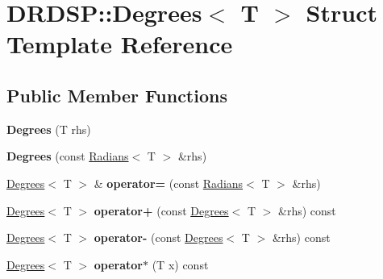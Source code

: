 \hypertarget{struct_d_r_d_s_p_1_1_degrees}{\section{D\-R\-D\-S\-P\-:\-:Degrees$<$ T $>$ Struct Template Reference}
\label{struct_d_r_d_s_p_1_1_degrees}
}
\subsection*{Public Member Functions}
\begin{DoxyCompactItemize}
\item 
\hypertarget{struct_d_r_d_s_p_1_1_degrees_aea5edb6561a07718684dabe4db75023a}{{\bfseries Degrees} (T rhs)}\label{struct_d_r_d_s_p_1_1_degrees_aea5edb6561a07718684dabe4db75023a}

\item 
\hypertarget{struct_d_r_d_s_p_1_1_degrees_a0d9d008f3a956963c5948ef48804f4bd}{{\bfseries Degrees} (const \hyperlink{struct_d_r_d_s_p_1_1_radians}{Radians}$<$ T $>$ \&rhs)}\label{struct_d_r_d_s_p_1_1_degrees_a0d9d008f3a956963c5948ef48804f4bd}

\item 
\hypertarget{struct_d_r_d_s_p_1_1_degrees_ac3bcd16cbcc7506b8a106137886517bc}{\hyperlink{struct_d_r_d_s_p_1_1_degrees}{Degrees}$<$ T $>$ \& {\bfseries operator=} (const \hyperlink{struct_d_r_d_s_p_1_1_radians}{Radians}$<$ T $>$ \&rhs)}\label{struct_d_r_d_s_p_1_1_degrees_ac3bcd16cbcc7506b8a106137886517bc}

\item 
\hypertarget{struct_d_r_d_s_p_1_1_degrees_a1f39a39d2d074f689b011a7cf19913d8}{\hyperlink{struct_d_r_d_s_p_1_1_degrees}{Degrees}$<$ T $>$ {\bfseries operator+} (const \hyperlink{struct_d_r_d_s_p_1_1_degrees}{Degrees}$<$ T $>$ \&rhs) const }\label{struct_d_r_d_s_p_1_1_degrees_a1f39a39d2d074f689b011a7cf19913d8}

\item 
\hypertarget{struct_d_r_d_s_p_1_1_degrees_ab1ffcb0e94295f81b13593291984b942}{\hyperlink{struct_d_r_d_s_p_1_1_degrees}{Degrees}$<$ T $>$ {\bfseries operator-\/} (const \hyperlink{struct_d_r_d_s_p_1_1_degrees}{Degrees}$<$ T $>$ \&rhs) const }\label{struct_d_r_d_s_p_1_1_degrees_ab1ffcb0e94295f81b13593291984b942}

\item 
\hypertarget{struct_d_r_d_s_p_1_1_degrees_af1390b65c4786bc138f20a28a29b94c4}{\hyperlink{struct_d_r_d_s_p_1_1_degrees}{Degrees}$<$ T $>$ {\bfseries operator$\ast$} (T x) const }\label{struct_d_r_d_s_p_1_1_degrees_af1390b65c4786bc138f20a28a29b94c4}


\end{DoxyCompactItemize}
